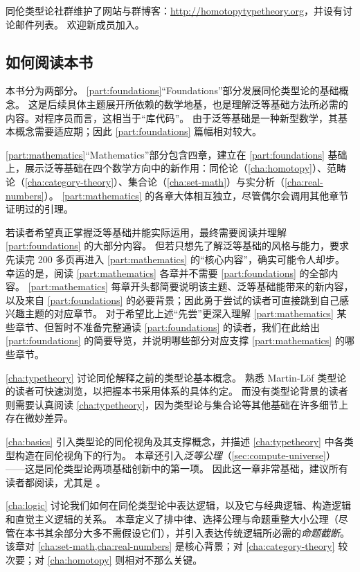 %

同伦类型论社群维护了网站与群博客：\url{http://homotopytypetheory.org}，并设有讨论邮件列表。
欢迎新成员加入。


\subsection*{如何阅读本书}

本书分为两部分。
\cref{part:foundations}“Foundations”部分发展同伦类型论的基础概念。
这是后续具体主题展开所依赖的数学地基，也是理解泛等基础方法所必需的内容。对程序员而言，这相当于“库代码”。
由于泛等基础是一种新型数学，其基本概念需要适应期；因此 \cref{part:foundations} 篇幅相对较大。

\cref{part:mathematics}“Mathematics”部分包含四章，建立在 \cref{part:foundations} 基础上，展示泛等基础在四个数学方向中的新作用：同伦论（\cref{cha:homotopy}）、范畴论（\cref{cha:category-theory}）、集合论（\cref{cha:set-math}）与实分析（\cref{cha:real-numbers}）。
\cref{part:mathematics} 的各章大体相互独立，尽管偶尔会调用其他章节证明过的引理。

若读者希望真正掌握泛等基础并能实际运用，最终需要阅读并理解 \cref{part:foundations} 的大部分内容。
但若只想先了解泛等基础的风格与能力，要求先读完 200 多页再进入 \cref{part:mathematics} 的“核心内容”，确实可能令人却步。
幸运的是，阅读 \cref{part:mathematics} 各章并不需要 \cref{part:foundations} 的全部内容。
\cref{part:mathematics} 每章开头都简要说明该主题、泛等基础能带来的新内容，以及来自 \cref{part:foundations} 的必要背景；因此勇于尝试的读者可直接跳到自己感兴趣主题的对应章节。
对于希望比上述“先尝”更深入理解 \cref{part:mathematics} 某些章节、但暂时不准备完整通读 \cref{part:foundations} 的读者，我们在此给出 \cref{part:foundations} 的简要导览，并说明哪些部分对应支撑 \cref{part:mathematics} 的哪些章节。

\cref{cha:typetheory} 讨论同伦解释之前的类型论基本概念。
熟悉 Martin-L\"of 类型论的读者可快速浏览，以把握本书采用体系的具体约定。
而没有类型论背景的读者则需要认真阅读 \cref{cha:typetheory}，因为类型论与集合论等其他基础在许多细节上存在微妙差异。

\cref{cha:basics} 引入类型论的同伦视角及其支撑概念，并描述 \cref{cha:typetheory} 中各类型构造在同伦视角下的行为。
本章还引入\emph{泛等公理}（\cref{sec:compute-universe}）——这是同伦类型论两项基础创新中的第一项。
因此这一章非常基础，建议所有读者都阅读，尤其是 。

\cref{cha:logic} 讨论我们如何在同伦类型论中表达逻辑，以及它与经典逻辑、构造逻辑和直觉主义逻辑的关系。
本章定义了排中律、选择公理与命题重整大小公理（尽管在本书其余部分大多不需假设它们），并引入表达传统逻辑所必需的\emph{命题截断}。
该章对 \cref{cha:set-math,cha:real-numbers} 是核心背景；对 \cref{cha:category-theory} 较次要；对 \cref{cha:homotopy} 则相对不那么关键。

